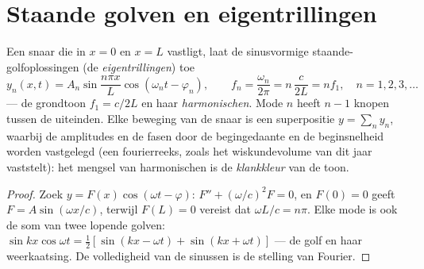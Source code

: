 \section{Staande golven en eigentrillingen}

\begin{proposition}\label{prop:b2:waves-on-strings:modes}
Een snaar die in $x = 0$ en $x = L$ vastligt, laat de sinusvormige
staande-golfoplossingen (de \emph{eigentrillingen}) toe
\[
y_n(x, t) = A_n\sin\frac{n\pi x}{L}\cos(\omega_nt - \varphi_n) , \qquad
f_n = \frac{\omega_n}{2\pi} = n\,\frac{c}{2L} = n f_1 , \quad n = 1, 2, 3, \dots
\]
--- de grondtoon $f_1 = c/2L$ en haar \emph{harmonischen}. Mode $n$ heeft
$n - 1$ knopen tussen de uiteinden. Elke beweging van de snaar is een
superpositie $y = \sum_ny_n$, waarbij de amplitudes en de fasen door de
begingedaante en de beginsnelheid worden vastgelegd (een fourierreeks, zoals
het wiskundevolume van dit jaar vaststelt): het mengsel van harmonischen is
de \emph{klankkleur} van de toon.
\end{proposition}

\begin{proof}
Zoek $y = F(x)\cos(\omega t - \varphi)$: $F'' + (\omega/c)^2F = 0$, en
$F(0) = 0$ geeft $F = A\sin(\omega x/c)$, terwijl $F(L) = 0$ vereist dat
$\omega L/c = n\pi$. Elke mode is ook de som van twee lopende golven:
$\sin kx\cos\omega t = \tfrac12[\sin(kx -
\omega t) + \sin(kx + \omega t)]$
--- de golf en haar weerkaatsing. De volledigheid van de sinussen is de
stelling van Fourier.
\end{proof}

